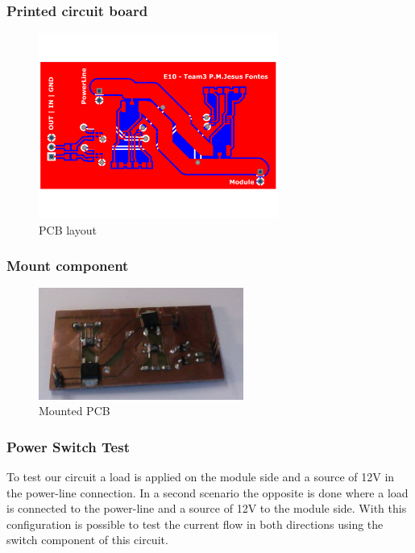 \subsubsection{Printed circuit board}

\begin{figure}[H]
	\begin{centering}
		 \includegraphics[width=0.7\textwidth,page=1]{images/ps_layout.pdf}
		\caption{PCB layout}
	\end{centering}
\end{figure}

\subsubsection{Mount component}

\begin{figure}[H]
	\begin{centering}
		\includegraphics[width=0.6\textwidth,page=1]{images/mounted.png}
		\caption{Mounted PCB}
	\end{centering}
\end{figure}

\subsubsection{Power Switch Test}
To test our circuit a load is applied on the module side and a source of 12V in the power-line connection. In a second scenario the opposite is done where a load is connected to the power-line and a source of 12V to the module side.
With this configuration is possible to test the current flow in both directions using the switch component of this circuit.

